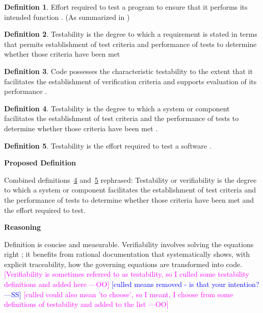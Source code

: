 \documentclass[letterpaper,cleveref]{lipics-v2019}
\newcommand{\authornote}[3]{\textcolor{#1}{[#3 ---#2]}}
\newcommand{\authornote}[3]{}
\newcommand{\wss}[1]{\authornote{blue}{SS}{#1}} %
\newcommand{\oo}[1]{\authornote{magenta}{OO}{#1}} %
\theoremstyle{definition}
\newtheorem{defn}{Definition}
\begin{document}
\begin{defn}
  Effort required to test a program to ensure that it performs its intended
  function \citep{McCallEtAl1977}. (As summarized in
  \citet{pressman2005software})
\end{defn}

\begin{defn}
  Testability is the degree to which a requirement is stated in terms that
  permits establishment of test criteria and performance of tests to determine
  whether those criteria have been met \citep{IEEEStdGlossarySET1990}
\end{defn}

\begin{defn}
  Code possesses the characteristic testability to the extent that it
  facilitates the establishment of verification criteria and supports evaluation
  of its performance \citep{boehm1976quantitative}.
\end{defn}

\begin{defn} \label{Defn_Verifiability1} 
  Testability is the degree to which a system or component facilitates the
  establishment of test criteria and the performance of tests to determine
  whether those criteria have been met \citep{ISO/IEC/IEEE24765}.
\end{defn}

\begin{defn} \label{Defn_Verifiability2} 
  Testability is the effort required to test a software
  \citep{ISO/IEC/IEEE24765}.
\end{defn}

\noindent \textbf{Proposed Definition}

Combined definitions~\ref{Defn_Verifiability1} and~\ref{Defn_Verifiability2}
rephrased: Testability or verifiability is the degree to which a system or
component facilitates the establishment of test criteria and the performance of
tests to determine whether those criteria have been met and the effort required
to test.

\noindent \textbf{Reasoning} 

Definition is concise and measurable.  Verifiability involves solving the
equations right \citep[p.~23]{Roache1998}; it benefits from rational
documentation that systematically shows, with explicit traceability, how the
governing equations are transformed into code.  \oo{Verifiability is sometimes
  referred to as testability, so I culled some testability definitions and added
  here} \wss{culled means removed - is that your intention?} \oo{culled could
  also mean 'to choose', so I meant, I choose from some definitions of
  testability and added to the list}
\end{document}
